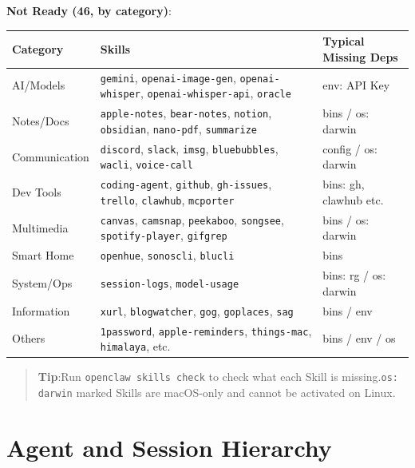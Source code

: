 \textbf{Not Ready (46, by category)}:

\begin{table}[h]
\centering
\small
\begin{tabular}{|l|l|l|}
\hline
Category & Skills & Typical Missing Deps \\
\hline
AI/Models & \texttt{gemini}, \texttt{openai-image-gen}, \texttt{openai-whisper}, \texttt{openai-whisper-api}, \texttt{oracle} & env: API Key \\
\hline
Notes/Docs & \texttt{apple-notes}, \texttt{bear-notes}, \texttt{notion}, \texttt{obsidian}, \texttt{nano-pdf}, \texttt{summarize} & bins / os: darwin \\
\hline
Communication & \texttt{discord}, \texttt{slack}, \texttt{imsg}, \texttt{bluebubbles}, \texttt{wacli}, \texttt{voice-call} & config / os: darwin \\
\hline
Dev Tools & \texttt{coding-agent}, \texttt{github}, \texttt{gh-issues}, \texttt{trello}, \texttt{clawhub}, \texttt{mcporter} & bins: gh, clawhub etc. \\
\hline
Multimedia & \texttt{canvas}, \texttt{camsnap}, \texttt{peekaboo}, \texttt{songsee}, \texttt{spotify-player}, \texttt{gifgrep} & bins / os: darwin \\
\hline
Smart Home & \texttt{openhue}, \texttt{sonoscli}, \texttt{blucli} & bins \\
\hline
System/Ops & \texttt{session-logs}, \texttt{model-usage} & bins: rg / os: darwin \\
\hline
Information & \texttt{xurl}, \texttt{blogwatcher}, \texttt{gog}, \texttt{goplaces}, \texttt{sag} & bins / env \\
\hline
Others & \texttt{1password}, \texttt{apple-reminders}, \texttt{things-mac}, \texttt{himalaya}, etc. & bins / env / os \\
\hline
\end{tabular}
\end{table}

\begin{quote}
\textbf{Tip}:Run \texttt{openclaw skills check} to check what each Skill is missing.\texttt{os: darwin} marked Skills are macOS-only and cannot be activated on Linux.
\end{quote}

\hrulefill

\section{Agent and Session Hierarchy}


